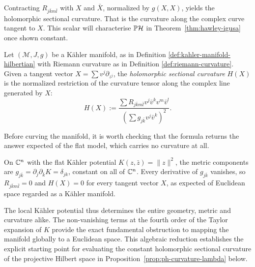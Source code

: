 \noindent Contracting \(R_{j\bar{k}m\bar{l}}\) with \(X\) and \(\bar{X}\), normalized by \(g(X,X)\), yields the holomorphic sectional curvature. That is the curvature along the complex curve tangent to \(X\). This scalar will characterise \(\PH\) in Theorem~\ref{thm:hawley-igusa} once shown constant.

\begin{definition}\label{def:holomorphic-curvature}
	Let $(\mathcal{M}, J, g)$ be a Kähler manifold, as in Definition \ref{def:kahler-manifold-hilbertian} with Riemann curvature as in Definition \ref{def:riemann-curvature}.  Given a tangent vector $X = \sum v^j \partial_{z^j}$, the \emph{holomorphic sectional curvature} $H(X)$ is the normalized restriction of the curvature tensor along the complex line generated by $X$:
	\begin{equation}
	H(X) := \frac{\sum R_{j\bar{k}m\bar{l}} v^j \bar{v}^k v^m \bar{v}^l}{\left( \sum g_{j\bar{k}} v^j \bar{v}^k \right)^2}.\label{eq:sec-curv}
	\end{equation}
\end{definition}

\noindent Before curving the manifold, it is worth checking that the formula returns the answer expected of the flat model, which carries no curvature at all.

\begin{example}
	\label{ex:flat-space-curvature}
	On $\mathbb{C}^n$ with the flat Kähler potential $K(z,\bar z)=\|z\|^2$, the
	metric components are $g_{j\bar{k}}=\partial_j\partial_{\bar{k}}K=\delta_{jk}$,
	constant on all of $\mathbb{C}^n$. Every derivative of $g_{j\bar{k}}$
	vanishes, so $R_{j\bar{k}m\bar{l}}=0$ and $H(X)=0$ for
	every tangent vector $X$, as expected of Euclidean space regarded as
	a Kähler manifold.
\end{example}

The local Kähler potential thus determines the entire geometry, metric and curvature alike. The non-vanishing terms at the fourth order of the Taylor expansion of $K$ provide the exact fundamental obstruction to mapping the manifold globally to a Euclidean space. This algebraic reduction establishes the explicit starting point for evaluating the constant holomorphic sectional curvature of the projective Hilbert space in Proposition~\ref{prop:ph-curvature-lambda} below.

